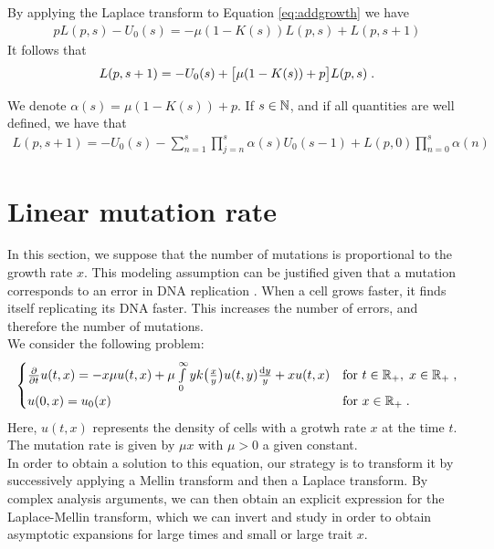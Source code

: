 \documentclass[11pt]{amsart}
\begin{document}
By applying the Laplace transform to Equation \eqref{eq:addgrowth} we have 
\begin{align*}
    pL(p,s) - U_0(s) = -  \mu (1-K(s)) L(p,s) + L(p,s+1)
\end{align*}
It follows that 
\begin{align*}
    L(p, s+1) = - U_0(s) + \big[\mu (1-K(s)) + p \big]L(p, s)
    \; .
\end{align*}

\begin{remark}
We denote $\alpha(s) = \mu (1-K(s)) + p$. If $s \in \mathbb{N}$, and if all quantities are well defined, we have that
\begin{align*}
    L(p, s+1) = -U_0(s) -\sum_{n = 1}^{s} \prod_{j = n}^s \alpha(s)U_0(s-1) + L(p,0) \prod_{n = 0}^{s}\alpha(n)
\end{align*}
\end{remark}



\section{Linear mutation rate}

In this section, we suppose that the number of mutations is proportional to the growth rate $x$. This modeling assumption can be justified given that a mutation corresponds to an error in DNA replication \cite{pray2008dna}. When a cell grows faster, it finds itself replicating its DNA faster. This increases the number of errors, and therefore the number of mutations.\\

We consider the following problem:
\begin{equation}
    \begin{cases}
	\frac{\partial}{\partial t}u(t,x) = - x\mu u(t,x) + \mu \int\limits_{0}^{\infty} y k\big( \frac{x}{y}\big) u(t,y) \frac{\mathrm dy}{y} + xu(t,x)
	& \text{for }t \in \mathbb{R}_+, \; x \in \mathbb{R}_+ \; ,
	\\
	u(0, x) = u_0(x)
	& \text{for }x \in \mathbb{R}_+
	\; .
    \end{cases}
    \label{eq:linearmutrate}
\end{equation}
Here, $u(t,x)$ represents the density of cells with a grotwh rate $x$ at the time $t$. The mutation rate is given by $\mu x$ with $\mu>0$ a given constant. \\

In order to obtain a solution to this equation, our strategy is to transform it by successively applying a Mellin transform and then a Laplace transform. By complex analysis arguments, we can then obtain an explicit expression for the Laplace-Mellin transform, which we can invert and study in order to obtain asymptotic expansions for large times and small or large trait $x$. \\
\end{document}
